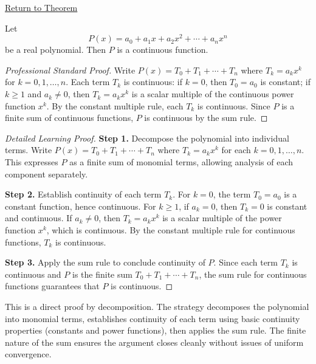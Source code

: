 \newpage
{}
\label{prf:polynomials-are-continuous}

\begin{remark*}[Return]
\hyperref[thm:polynomials-are-continuous]{Return to Theorem}
\end{remark*}

\begin{theorem*}
Let
\[
  P(x) = a_0 + a_1 x + a_2 x^2 + \cdots + a_n x^n
\]
be a real polynomial. Then $P$ is a continuous function.
\end{theorem*}

\begin{proof}[Professional Standard Proof]
\LRAProofBodyStart
Write $P(x) = T_0 + T_1 + \cdots + T_n$ where $T_k = a_k x^k$ for $k = 0, 1, \ldots, n$. Each term $T_k$ is continuous: if $k = 0$, then $T_0 = a_0$ is constant; if $k \geq 1$ and $a_k \neq 0$, then $T_k = a_k x^k$ is a scalar multiple of the continuous power function $x^k$. By the constant multiple rule, each $T_k$ is continuous. Since $P$ is a finite sum of continuous functions, $P$ is continuous by the sum rule.
\end{proof}

\begin{proof}[Detailed Learning Proof]
\LRAProofBodyStart

\textbf{Step 1.} Decompose the polynomial into individual terms. Write $P(x) = T_0 + T_1 + \cdots + T_n$ where $T_k = a_k x^k$ for each $k = 0, 1, \ldots, n$. This expresses $P$ as a finite sum of monomial terms, allowing analysis of each component separately.

\textbf{Step 2.} Establish continuity of each term $T_k$. For $k = 0$, the term $T_0 = a_0$ is a constant function, hence continuous. For $k \geq 1$, if $a_k = 0$, then $T_k = 0$ is constant and continuous. If $a_k \neq 0$, then $T_k = a_k x^k$ is a scalar multiple of the power function $x^k$, which is continuous. By the constant multiple rule for continuous functions, $T_k$ is continuous.

\textbf{Step 3.} Apply the sum rule to conclude continuity of $P$. Since each term $T_k$ is continuous and $P$ is the finite sum $T_0 + T_1 + \cdots + T_n$, the sum rule for continuous functions guarantees that $P$ is continuous.
\end{proof}

\begin{remark*}
This is a direct proof by decomposition. The strategy decomposes the polynomial into monomial terms, establishes continuity of each term using basic continuity properties (constants and power functions), then applies the sum rule. The finite nature of the sum ensures the argument closes cleanly without issues of uniform convergence.
\end{remark*}


